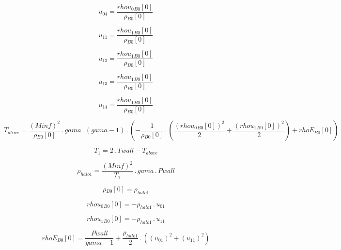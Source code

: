 \documentclass{article}
\begin{document}
\begin{dmath}u_{04} = \frac{{rhou_{0}{_{B0}}}[{0}]}{{\rho{_{B0}}}[{0}]}\end{dmath}

\begin{dmath}u_{11} = \frac{{rhou_{1}{_{B0}}}[{0}]}{{\rho{_{B0}}}[{0}]}\end{dmath}

\begin{dmath}u_{12} = \frac{{rhou_{1}{_{B0}}}[{0}]}{{\rho{_{B0}}}[{0}]}\end{dmath}

\begin{dmath}u_{13} = \frac{{rhou_{1}{_{B0}}}[{0}]}{{\rho{_{B0}}}[{0}]}\end{dmath}

\begin{dmath}u_{14} = \frac{{rhou_{1}{_{B0}}}[{0}]}{{\rho{_{B0}}}[{0}]}\end{dmath}

\begin{dmath}T_{above} = \frac{\left(Minf \right)^{2}}{{\rho{_{B0}}}[{0}]} \,.\, gama \,.\, \left(gama - 1\right) \,.\, \left(- \frac{1}{{\rho{_{B0}}}[{0}]} \,.\, \left(\frac{\left({rhou_{0}{_{B0}}}[{0}] \right)^{2}}{2} + 
\frac{\left({rhou_{1}{_{B0}}}[{0}] \right)^{2}}{2}\right) + {rhoE{_{B0}}}[{0}]\right)\end{dmath}

\begin{dmath}T_{1} = 2 \,.\, Twall - T_{above}\end{dmath}

\begin{dmath}\rho_{halo 1} = \frac{\left(Minf \right)^{2}}{T_{1}} \,.\, gama \,.\, Pwall\end{dmath}

\begin{dmath}{\rho{_{B0}}}[{0}] = \rho_{halo 1}\end{dmath}

\begin{dmath}{rhou_{0}{_{B0}}}[{0}] = - \rho_{halo 1} \,.\, u_{01}\end{dmath}

\begin{dmath}{rhou_{1}{_{B0}}}[{0}] = - \rho_{halo 1} \,.\, u_{11}\end{dmath}

\begin{dmath}{rhoE{_{B0}}}[{0}] = \frac{Pwall}{gama - 1} + \frac{\rho_{halo 1}}{2} \,.\, \left(\left(u_{01} \right)^{2} + \left(u_{11} \right)^{2}\right)\end{dmath}
\end{document}
